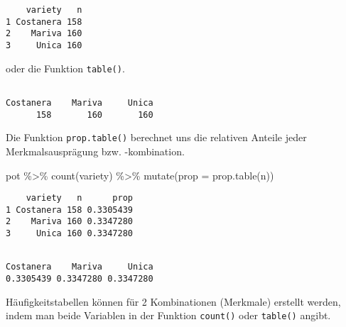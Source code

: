 \documentclass[
  letterpaper,
  DIV=11,
  numbers=noendperiod]{scrartcl}
\newenvironment{Shaded}{\begin{snugshade}}{\end{snugshade}}
\newcommand{\AttributeTok}[1]{\textcolor[rgb]{0.40,0.45,0.13}{#1}}
\newcommand{\CommentTok}[1]{\textcolor[rgb]{0.37,0.37,0.37}{#1}}
\newcommand{\FunctionTok}[1]{\textcolor[rgb]{0.28,0.35,0.67}{#1}}
\newcommand{\NormalTok}[1]{\textcolor[rgb]{0.00,0.23,0.31}{#1}}
\newcommand{\SpecialCharTok}[1]{\textcolor[rgb]{0.37,0.37,0.37}{#1}}
\begin{document}
\begin{verbatim}
    variety   n
1 Costanera 158
2    Mariva 160
3     Unica 160
\end{verbatim}

oder die Funktion \texttt{table()}.

\begin{Shaded}
\end{Shaded}

\begin{verbatim}

Costanera    Mariva     Unica 
      158       160       160 
\end{verbatim}

Die Funktion \texttt{prop.table()} berechnet uns die relativen Anteile
jeder Merkmalsausprägung bzw. -kombination.

\begin{Shaded}
\begin{Highlighting}[]
\NormalTok{pot }\SpecialCharTok{\%\textgreater{}\%} \FunctionTok{count}\NormalTok{(variety) }\SpecialCharTok{\%\textgreater{}\%} 
  \FunctionTok{mutate}\NormalTok{(}\AttributeTok{prop =} \FunctionTok{prop.table}\NormalTok{(n))}
\end{Highlighting}
\end{Shaded}

\begin{verbatim}
    variety   n      prop
1 Costanera 158 0.3305439
2    Mariva 160 0.3347280
3     Unica 160 0.3347280
\end{verbatim}

\begin{Shaded}
\end{Shaded}

\begin{verbatim}

Costanera    Mariva     Unica 
0.3305439 0.3347280 0.3347280 
\end{verbatim}

Häufigkeitstabellen können für 2 Kombinationen (Merkmale) erstellt
werden, indem man beide Variablen in der Funktion \texttt{count()} oder
\texttt{table()} angibt.
\end{document}
